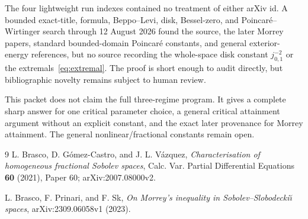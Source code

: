 \documentclass[11pt]{article}
\begin{document}
The four lightweight run indexes contained no treatment of either arXiv id.
A bounded exact-title, formula, Beppo--Levi, disk, Bessel-zero, and
Poincar\'e--Wirtinger search through 12 August 2026 found the source, the later
Morrey papers, standard bounded-domain Poincar\'e constants, and general
exterior-energy references, but no source recording the whole-space disk
constant $j_{0,1}^{-2}$ or the extremals~\eqref{eq:extremal}.  The proof is
short enough to audit directly, but bibliographic novelty remains subject to
human review.

This packet does not claim the full three-regime program.  It gives a complete
sharp answer for one critical parameter choice, a general critical attainment
argument without an explicit constant, and the exact later provenance for
Morrey attainment.  The general nonlinear/fractional constants remain open.

\begin{thebibliography}{9}
L. Brasco, D. G\'omez-Castro, and J. L. V\'azquez,
\emph{Characterisation of homogeneous fractional Sobolev spaces},
Calc. Var. Partial Differential Equations \textbf{60} (2021), Paper 60;
arXiv:2007.08000v2.

L. Brasco, F. Prinari, and F. Sk,
\emph{On Morrey's inequality in Sobolev--Slobodecki\u{\i} spaces},
arXiv:2309.06058v1 (2023).
\end{thebibliography}
\end{document}
